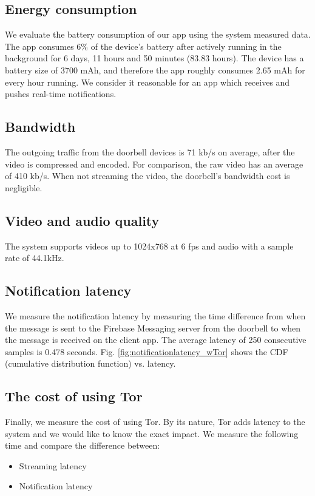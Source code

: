 \subsection{Energy consumption}
We evaluate the battery consumption of our app using the system measured data. The app consumes 6\% of the device's battery after actively running in the background for 6 days, 11 hours and 50 minutes (83.83 hours). The device has a battery size of 3700 mAh, and therefore the app roughly consumes 2.65 mAh for every hour running. We consider it reasonable for an app which receives and pushes real-time notifications.

\subsection{Bandwidth}
The outgoing traffic from the doorbell devices is 71 kb/s on average, after the video is compressed and encoded. For comparison, the raw video has an average of 410 kb/s. When not streaming the video, the doorbell's bandwidth cost is negligible.

\subsection{Video and audio quality}
The system supports videos up to 1024x768 at 6 fps and audio with a sample rate of 44.1kHz.

\subsection{Notification latency}
\label{subsec:notification_latency}
We measure the notification latency by measuring the time difference from when the message is sent to the Firebase Messaging server from the doorbell to when the message is received on the client app. The average latency of 250 consecutive samples is 0.478 seconds. Fig. \ref{fig:notificationlatency_wTor} shows the CDF (cumulative distribution function) vs. latency.

\subsection{The cost of using Tor}
Finally, we measure the cost of using Tor. By its nature, Tor adds latency to the system and we would like to know the exact impact. We measure the following time and compare the difference between:

\begin{itemize}
	\item Streaming latency
	\item Notification latency
\end{itemize}

